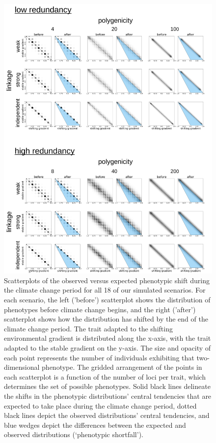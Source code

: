 \documentclass[9pt,twoside,lineno]{new_article}
\begin{document}
\begin{figure}
\centering
\includegraphics[width=.8\linewidth]{pub/figs_and_stats/FIG_S4_phenotypic_shift_null.jpg}
    \caption{Scatterplots of the observed versus expected phenotypic shift during the climate change period for all 18 of our simulated scenarios. For each scenario, the left (’before’) scatterplot shows the distribution of phenotypes before climate change begins, and the right (’after’) scatterplot shows how the distribution has shifted by the end of the climate change period. The trait adapted to the shifting environmental gradient is distributed along the x-axis, with the trait adapted to the stable gradient on the y-axis. The size and opacity of each point represents the number of individuals exhibiting that two-dimensional phenotype. The gridded arrangement of the points in each scatterplot is a function of the number of loci per trait, which determines the set of possible phenotypes. Solid black lines delineate the shifts in the phenotypic distributions’ central tendencies that are expected to take place during the climate change period, dotted black lines depict the observed distributions’ central tendencies, and blue wedges depict the differences between the expected and observed distributions (‘phenotypic shortfall’).}
\label{fig:fig_s4}
\end{figure}
\end{document}
